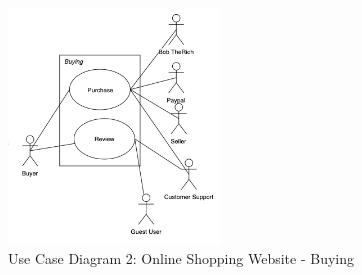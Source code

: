 \documentclass[11pt]{article}
\begin{document}
\begin{figure}[htbp]
    \centering
    \includegraphics[width=0.5\textwidth]{ucd2.png}
    \caption{Use Case Diagram 2: Online Shopping Website - Buying }
    \label{fig:ucd2}
\end{figure}
\end{document}
